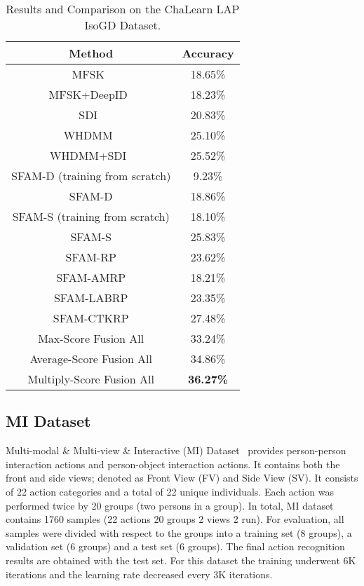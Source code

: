 \documentclass[10pt,twocolumn,letterpaper]{article}
\begin{document}
\begin{table}[!ht]
\centering
\begin{tabular}{|c|c|}
\hline
Method & Accuracy \\
\hline
MFSK~\cite{pami16Jun,wanchalearn}  & 18.65\%\\
\hline
MFSK+DeepID~\cite{pami16Jun,wanchalearn}  & 18.23\%\\
\hline
SDI~\cite{bilen2016dynamic}  & 20.83\%\\
\hline
WHDMM~\cite{pichaoTHMS}  & 25.10\%\\
\hline
WHDMM+SDI~\cite{pichaoTHMS,bilen2016dynamic}  & 25.52\%\\
\hline\hline
SFAM-D (training from scratch) & 9.23\%\\
\hline
SFAM-D & 18.86\%\\
\hline
SFAM-S (training from scratch)  & 18.10\%\\
\hline
SFAM-S  & 25.83\%\\
\hline
SFAM-RP  & 23.62\%\\
\hline
SFAM-AMRP  & 18.21\%\\
\hline
SFAM-LABRP  & 23.35\%\\
\hline
SFAM-CTKRP  & 27.48\%\\
\hline
Max-Score Fusion All  & 33.24\%\\
\hline
Average-Score Fusion All  & 34.86\%\\
\hline
Multiply-Score Fusion All  & \textbf{36.27\%}\\
\hline
\end{tabular}
\caption{Results and Comparison on the ChaLearn LAP IsoGD Dataset. \label{table1}}
\end{table}



\subsection{MI Dataset}
Multi-modal \& Multi-view \& Interactive (MI) 
Dataset~\cite{liu2016benchmarking} 
provides person-person interaction 
actions and person-object interaction actions. It contains both the 
front and side views; denoted as Front View (FV) and Side View (SV). It 
consists of 22 action categories and a total of 22 unique individuals. Each 
action was performed twice by 20 groups (two persons in a group). In total, 
MI dataset contains 1760 samples (22 actions  20 groups 
 2 views  2 run).  For evaluation, all samples were divided with respect to the groups into 
a training set (8 groups), a validation set (6 groups) and a test set (6 
groups). The final action recognition results are obtained with the test set. 
For this dataset the training underwent 6K iterations and the learning rate 
decreased every 3K iterations.
 
\end{document}
